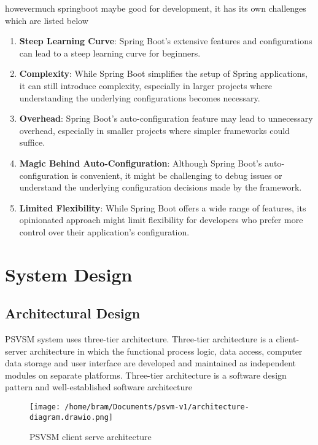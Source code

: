 \documentclass[a4paper, 12pt]{report}
\begin{document}
howevermuch springboot maybe good for development, it has its own challenges which are listed below \par 
\begin{enumerate}
  \item \textbf{Steep Learning Curve}: Spring Boot's extensive features and configurations can lead to a steep learning curve for beginners.
  
  \item \textbf{Complexity}: While Spring Boot simplifies the setup of Spring applications, it can still introduce complexity, especially in larger projects where understanding the underlying configurations becomes necessary.
  
  \item \textbf{Overhead}: Spring Boot's auto-configuration feature may lead to unnecessary overhead, especially in smaller projects where simpler frameworks could suffice.
  
  \item \textbf{Magic Behind Auto-Configuration}: Although Spring Boot's auto-configuration is convenient, it might be challenging to debug issues or understand the underlying configuration decisions made by the framework.
  
  \item \textbf{Limited Flexibility}: While Spring Boot offers a wide range of features, its opinionated approach might limit flexibility for developers who prefer more control over their application's configuration.
\end{enumerate}

\chapter{System Design}
\section{Architectural Design} 
PSVSM system uses three-tier architecture. Three-tier architecture is a client-server architecture
in which the functional process logic, data access, computer data storage and user interface are
developed and maintained as independent modules on separate platforms. Three-tier architecture
is a software design pattern and well-established software architecture
\begin{figure}[h] %
  \centering
  \texttt{[image: /home/bram/Documents/psvm-v1/architecture-diagram.drawio.png]} %
  \caption{PSVSM client serve architecture} %
  \label{fig:psvsm structure} %
\end{figure}
\end{document}
